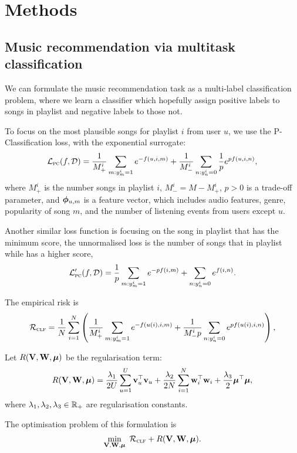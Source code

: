 \section{Methods}

\subsection{Music recommendation via multitask classification}

We can formulate the music recommendation task as a multi-label classification problem,
where we learn a classifier which hopefully assign positive labels to songs in playlist and negative labels to those not.

To focus on the most plausible songs for playlist $i$ from user $u$,
we use the P-Classification loss, with the exponential surrogate:
\begin{equation*}
\begin{aligned}
\mathcal{L}_\textsc{pc}(f, \mathcal{D}) 
&= \frac{1}{M_+^i} \sum_{m: y_m^i = 1} e^{-f(u, i, m)} + \frac{1}{M_-^i} \sum_{n: y_n^i = 0} \frac{1}{p} e^{p f(u, i, n)}, \\
\end{aligned}
\end{equation*}
where $M_+^i$ is the number songs in playlist $i$,
$M_-^i = M - M_+^i$,
$p > 0$ is a trade-off parameter,
and $\bm{\phi}_{u,m}$ is a feature vector,
which includes audio features, genre, popularity of song $m$,
and the number of listening events from users except $u$.

Another similar loss function is focusing on the song in playlist that has the minimum score,
the unnormalised loss is the number of songs that in playlist while has a higher score, \ie
$$
\mathcal{L}_\textsc{pc}'(f, \mathcal{D})
= \frac{1}{p} \sum_{m: y_m^i = 1} e^{-p f(i, m)} + \sum_{n: y_n^i = 0} e^{f(i, n)}.
$$

The empirical risk is
$$
\mathcal{R}_\textsc{clf} 
= \frac{1}{N} \sum_{i=1}^N \left( \frac{1}{M_+^i} \sum_{m: y_m^i = 1} e^{-f(u(i),i,m)} 
  + \frac{1}{M_-^i p} \sum_{n: y_n^i = 0} e^{p f(u(i), i,n)} \right),
$$

Let $R(\mathbf{V}, \mathbf{W}, \bm{\mu})$ be the regularisation term:
$$
R(\mathbf{V}, \mathbf{W}, \bm{\mu}) 
= \frac{\lambda_1}{2U} \sum_{u=1}^U \mathbf{v}_u^\top \mathbf{v}_u + \frac{\lambda_2}{2N} \sum_{i=1}^N \mathbf{w}_i^\top \mathbf{w}_i + \frac{\lambda_3}{2} \bm{\mu}^\top \bm{\mu},
$$
where $\lambda_1, \lambda_2, \lambda_3 \in \mathbb{R}_+$ are regularisation constants.

The optimisation problem of this formulation is
\begin{equation*}
\begin{aligned}
\min_{\mathbf{V}, \mathbf{W}, \bm{\mu}} \ \mathcal{R}_\textsc{clf} + R(\mathbf{V}, \mathbf{W}, \bm{\mu}).
\end{aligned}
\end{equation*}
